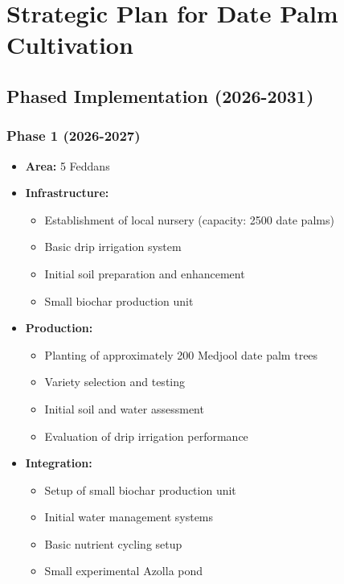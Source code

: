 \section{Strategic Plan for Date Palm Cultivation}

\subsection{Phased Implementation (2026-2031)}

\subsubsection{Phase 1 (2026-2027)}
\begin{itemize}
    \item \textbf{Area:} 5 Feddans
    \item \textbf{Infrastructure:}
    \begin{itemize}
        \item Establishment of local nursery (capacity: 2500 date palms)
        \item Basic drip irrigation system
        \item Initial soil preparation and enhancement
        \item Small biochar production unit
    \end{itemize}
    \item \textbf{Production:}
    \begin{itemize}
        \item Planting of approximately 200 Medjool date palm trees
        \item Variety selection and testing
        \item Initial soil and water assessment
        \item Evaluation of drip irrigation performance
    \end{itemize}
    \item \textbf{Integration:}
    \begin{itemize}
        \item Setup of small biochar production unit
        \item Initial water management systems
        \item Basic nutrient cycling setup
        \item Small experimental Azolla pond
    \end{itemize}
\end{itemize}

